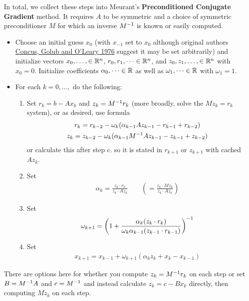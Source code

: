 \documentclass[11pt]{article}
\begin{document}
In total, we collect these steps into Meurant's \textbf{Preconditioned Conjugate Gradient} method. It requires $A$ to be symmetric and a choice of symmetric preconditioner $M$ for which an inverse $M^{-1}$ is known or easily computed. \begin{itemize}
\item Choose an initial guess $x_0$ (with $x_{-1}$ set to $x_0$ although original authors \hyperlink{http://i.stanford.edu/pub/cstr/reports/cs/tr/76/533/CS-TR-76-533.pdf}{Concus, Golub and O'Leary 1976} suggest it may be set arbitrarily) and initialize vectors $x_0, \dots, \in \mathbb{R}^n$, $r_0, r_1, \dots \in \mathbb{R}^n$, and $z_0, z_1, \dots, \in \mathbb{R}^n$ with $x_0 = 0$. Initialize coefficients $\alpha_0, \dots \in \mathbb{R}$ as well as $\omega_1, \dots \in \mathbb{R}$ with $\omega_1 = 1$.
\item For each $k = 0, \dots,$ do the following: \begin{enumerate}
\item Set $r_k = b - Ax_k$ and $z_k = M^{-1} r_k$ (more broadly, solve the $M z_k = r_k$ system), or as desired, use formula \begin{gather*}
r_{k} = r_{k-2} - \omega_{k}(\alpha_{k-1} A z_{k-1} - r_{k-1} + r_{k-2}) \\
z_{k} = z_{k-2} - \omega_{k}(\alpha_{k-1} M^{-1} A z_{k-1} - z_{k-1} + z_{k-2})
\end{gather*}
or calculate this after step c. so it is stated in $r_{k+1}$ or $z_{k+1}$ with cached $A z_k$. 
\item Set \begin{gather*}
\alpha_k = \frac{z_k \cdot r_k}{z_k \cdot A z_k} \hspace{2em} \left(= \frac{z_k \cdot Mz_k}{z_k \cdot A z_k}  \right)
\end{gather*}
\item Set \begin{gather*}
\omega_{k+1} = \left( 1 + \frac{\alpha_k (z_k \cdot r_k )}{\omega_k \alpha_{k-1}(z_{k-1} \cdot r_{k-1})}\right)^{-1}
\end{gather*}
\item Set \begin{gather*}
x_{k+1} = x_{k-1} + \omega_{k+1} (\alpha_k z_k + x_k - x_{k-1})
\end{gather*}
\end{enumerate}
\end{itemize}
There are options here for whether you compute $z_k = M^{-1} r_k$ on each step or set $B = M^{-1} A$ and $c = M^{-1}$ and instead calculate $z_k = c - Bx_k$ directly, then computing $Mz_k$ on each step.
\end{document}
